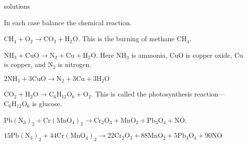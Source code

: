 \begin{Filesave}{solutions}
\end{Filesave}

\noindent In each case balance the chemical reaction.
\begin{multicols}{2}
\begin{ex}
$\mbox{CH}_{4} + \mbox{O}_2 \to \mbox{CO}_{2} + \mbox{H}_{2}\mbox{O}$. This is the burning of methane $\mbox{CH}_{4}$. 
\end{ex}

\begin{ex}
$\mbox{NH}_{3} + \mbox{CuO} \to \mbox{N}_{2} + \mbox{Cu} + \mbox{H}_{2}\mbox{O}$. Here $\mbox{NH}_{3}$ is ammonia, $\mbox{CuO}$ is copper oxide, $\mbox{Cu}$ is copper, and $\mbox{N}_{2}$ is nitrogen.

\begin{sol}
$2\mbox{NH}_{3} + 3\mbox{CuO} \rightarrow \mbox{N}_{2} + 3\mbox{Cu} + 3\mbox{H}_{2}\mbox{O}$
\end{sol}
\end{ex}

\columnbreak

\begin{ex}
$\mbox{CO}_{2} + \mbox{H}_{2}\mbox{O} \to \mbox{C}_{6}\mbox{H}_{12}\mbox{O}_{6} + \mbox{O}_{2}$. This is called the photosynthesis reaction---$\mbox{C}_{6}\mbox{H}_{12}\mbox{O}_{6}$ is glucose.
\end{ex}

\begin{ex}
$\mbox{Pb}(\mbox{N}_{3})_{2} + \mbox{Cr}(\mbox{MnO}_{4})_{2} \to \mbox{Cr}_{2}\mbox{O}_{3} + \mbox{MnO}_{2} + \mbox{Pb}_{3}\mbox{O}_{4} + \mbox{NO}$.

\begin{sol}
$15\mbox{Pb}(\mbox{N}_{3})_{2} + 44\mbox{Cr}(\mbox{MnO}_{4})_{2}  \rightarrow
 22\mbox{Cr}_{2}\mbox{O}_{3} + 88\mbox{MnO}_{2} + 5\mbox{Pb}_{3}\mbox{O}_{4} + 90\mbox{NO}$
\end{sol}
\end{ex}
\end{multicols}
